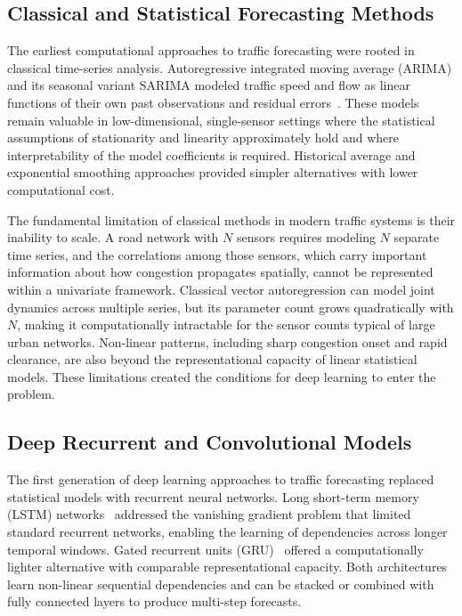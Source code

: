 \documentclass[fleqn,10pt]{wlscirep}
\begin{document}
\subsection{Classical and Statistical Forecasting Methods}

The earliest computational approaches to traffic forecasting were
rooted in classical time-series analysis. Autoregressive integrated
moving average (ARIMA) and its seasonal variant SARIMA modeled traffic
speed and flow as linear functions of their own past observations and
residual errors~\cite{box1970time}. These models remain valuable
in low-dimensional, single-sensor settings where the statistical
assumptions of stationarity and linearity approximately hold and where
interpretability of the model coefficients is required. Historical
average and exponential smoothing approaches provided simpler
alternatives with lower computational cost.

The fundamental limitation of classical methods in modern traffic
systems is their inability to scale. A road network with $N$ sensors
requires modeling $N$ separate time series, and the correlations
among those sensors, which carry important information about how
congestion propagates spatially, cannot be represented within a
univariate framework. Classical vector autoregression can model
joint dynamics across multiple series, but its parameter count grows
quadratically with $N$, making it computationally intractable for
the sensor counts typical of large urban networks. Non-linear
patterns, including sharp congestion onset and rapid clearance,
are also beyond the representational capacity of linear statistical
models. These limitations created the conditions for deep learning
to enter the problem.

\subsection{Deep Recurrent and Convolutional Models}

The first generation of deep learning approaches to traffic
forecasting replaced statistical models with recurrent neural
networks. Long short-term memory (LSTM) networks~\cite{hochreiter1997lstm}
addressed the vanishing gradient problem that limited standard
recurrent networks, enabling the learning of dependencies across
longer temporal windows. Gated recurrent units (GRU)~\cite{cho2014gru}
offered a computationally lighter alternative with comparable
representational capacity. Both architectures learn non-linear
sequential dependencies and can be stacked or combined with fully
connected layers to produce multi-step forecasts.
\end{document}
